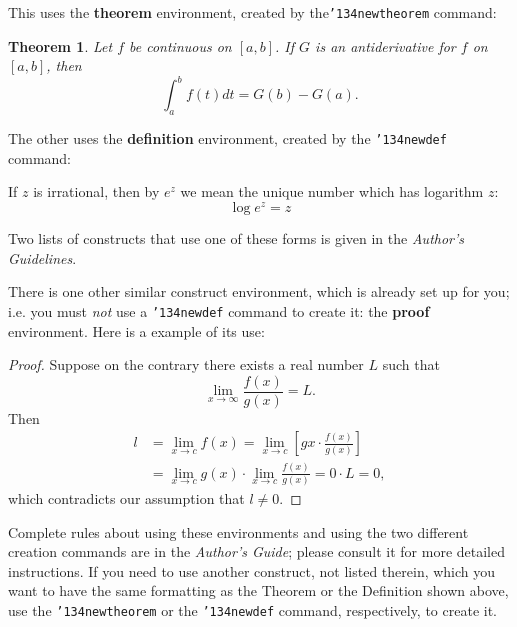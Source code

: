 \documentclass{vldb}
\begin{document}
This uses the \textbf{theorem} environment, created by
the\linebreak\texttt{{\char'134}newtheorem} command:
\newtheorem{theorem}{Theorem}
\begin{theorem}
Let $f$ be continuous on $[a,b]$.  If $G$ is
an antiderivative for $f$ on $[a,b]$, then
\begin{displaymath}\int^b_af(t)dt = G(b) - G(a).\end{displaymath}
\end{theorem}

The other uses the \textbf{definition} environment, created
by the \texttt{{\char'134}newdef} command:
\begin{definition}
If $z$ is irrational, then by $e^z$ we mean the
unique number which has
logarithm $z$: \begin{displaymath}{\log e^z = z}\end{displaymath}
\end{definition}

Two lists of constructs that use one of these
forms is given in the
\textit{Author's  Guidelines}.


There is one other similar construct environment, which is
already set up
for you; i.e. you must \textit{not} use
a \texttt{{\char'134}newdef} command to
create it: the \textbf{proof} environment.  Here
is a example of its use:
\begin{proof}
Suppose on the contrary there exists a real number $L$ such that
\begin{displaymath}
\lim_{x\rightarrow\infty} \frac{f(x)}{g(x)} = L.
\end{displaymath}
Then
\begin{align*}
l&=\lim_{x\rightarrow c} f(x)
= \lim_{x\rightarrow c}
\left[ g{x} \cdot \frac{f(x)}{g(x)} \right ] \\
&= \lim_{x\rightarrow c} g(x) \cdot \lim_{x\rightarrow c}
\frac{f(x)}{g(x)} = 0\cdot L = 0,
\end{align*}
which contradicts our assumption that $l\neq 0$.
\end{proof}

Complete rules about using these environments and using the
two different creation commands are in the
\textit{Author's Guide}; please consult it for more
detailed instructions.  If you need to use another construct,
not listed therein, which you want to have the same
formatting as the Theorem
or the Definition\cite{salas:calculus} shown above,
use the \texttt{{\char'134}newtheorem} or the
\texttt{{\char'134}newdef} command,
respectively, to create it.
\end{document}

